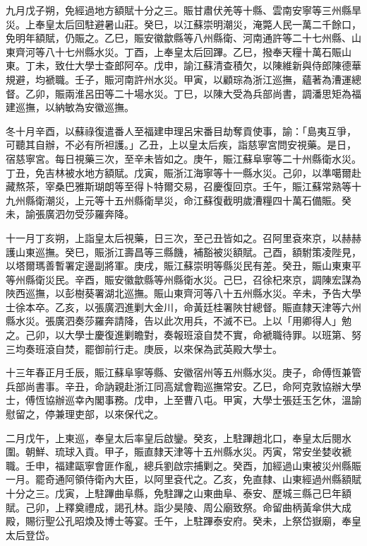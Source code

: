 \begin{pinyinscope}
九月戊子朔，免經過地方額賦十分之三。賑甘肅伏羌等十縣、雲南安寧等三州縣旱災。上奉皇太后回駐避暑山莊。癸巳，以江蘇崇明潮災，淹斃人民一萬二千餘口，免明年額賦，仍賑之。乙巳，賑安徽歙縣等八州縣衛、河南通許等二十七州縣、山東齊河等八十七州縣水災。丁酉，上奉皇太后回蹕。乙巳，撥奉天糧十萬石賑山東。丁未，致仕大學士查郎阿卒。戊申，諭江蘇清查積欠，以陳維新與侍郎陳德華規避，均褫職。壬子，賑河南許州水災。甲寅，以顧琮為浙江巡撫，蘊著為漕運總督。乙卯，賑兩淮呂田等二十場水災。丁巳，以陳大受為兵部尚書，調潘思矩為福建巡撫，以納敏為安徽巡撫。

冬十月辛酉，以蘇祿復遣番人至福建申理呂宋番目劫奪貢使事，諭：「島夷互爭，可聽其自辦，不必有所袒護。」乙丑，上以皇太后疾，詣慈寧宮問安視藥。是日，宿慈寧宮。每日視藥三次，至辛未皆如之。庚午，賑江蘇阜寧等二十州縣衛水災。丁丑，免吉林被水地方額賦。戊寅，賑浙江海寧等十一縣水災。己卯，以準噶爾赴藏熬茶，宰桑巴雅斯瑚朗等至得卜特爾交易，召慶復回京。壬午，賑江蘇常熟等十九州縣衛潮災，上元等十五州縣衛旱災，命江蘇復截明歲漕糧四十萬石備賑。癸未，諭張廣泗勿受莎羅奔降。

十一月丁亥朔，上詣皇太后視藥，日三次，至己丑皆如之。召阿里袞來京，以赫赫護山東巡撫。癸巳，賑浙江壽昌等三縣饑，補豁被災額賦。己酉，額駙策凌陛見，以塔爾瑪善暫署定邊副將軍。庚戌，賑江蘇崇明等縣災民有差。癸丑，賑山東東平等州縣衛災民。辛酉，賑安徽歙縣等州縣衛水災。己巳，召徐杞來京，調陳宏謀為陜西巡撫，以彭樹葵署湖北巡撫。賑山東齊河等八十五州縣水災。辛未，予告大學士徐本卒。乙亥，以張廣泗進剿大金川，命黃廷桂署陜甘總督。賑直隸天津等六州縣水災。張廣泗奏莎羅奔請降，告以此次用兵，不滅不已。上以「用卿得人」勉之。己卯，以大學士慶復進剿瞻對，奏報班滾自焚不實，命褫職待罪。以班第、努三均奏班滾自焚，罷御前行走。庚辰，以來保為武英殿大學士。

十三年春正月壬辰，賑江蘇阜寧等縣、安徽宿州等五州縣水災。庚子，命傅恆兼管兵部尚書事。辛丑，命訥親赴浙江同高斌會鞫巡撫常安。乙巳，命阿克敦協辦大學士，傅恆協辦巡幸內閣事務。戊申，上至曹八屯。甲寅，大學士張廷玉乞休，溫諭慰留之，停兼理吏部，以來保代之。

二月戊午，上東巡，奉皇太后率皇后啟鑾。癸亥，上駐蹕趙北口，奉皇太后閱水圍。朝鮮、琉球入貢。甲子，賑直隸天津等十五州縣水災。丙寅，常安坐婪收褫職。壬申，福建甌寧會匪作亂，總兵劉啟宗捕剿之。癸酉，加經過山東被災州縣賑一月。罷奇通阿領侍衛內大臣，以阿里袞代之。乙亥，免直隸、山東經過州縣額賦十分之三。戊寅，上駐蹕曲阜縣，免駐蹕之山東曲阜、泰安、歷城三縣己巳年額賦。己卯，上釋奠禮成，謁孔林。詣少昊陵、周公廟致祭。命留曲柄黃傘供大成殿，賜衍聖公孔昭煥及博士等宴。壬午，上駐蹕泰安府。癸未，上祭岱嶽廟，奉皇太后登岱。


\end{pinyinscope}
